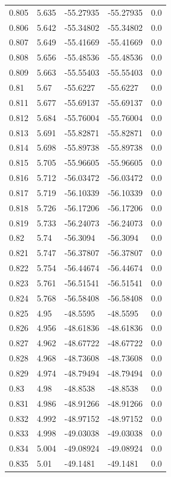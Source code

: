 \begin{tabular}{lllll}
0.805 & 5.635 & -55.27935 & -55.27935 & 0.0 \\
0.806 & 5.642 & -55.34802 & -55.34802 & 0.0 \\
0.807 & 5.649 & -55.41669 & -55.41669 & 0.0 \\
0.808 & 5.656 & -55.48536 & -55.48536 & 0.0 \\
0.809 & 5.663 & -55.55403 & -55.55403 & 0.0 \\
0.81 & 5.67 & -55.6227 & -55.6227 & 0.0 \\
0.811 & 5.677 & -55.69137 & -55.69137 & 0.0 \\
0.812 & 5.684 & -55.76004 & -55.76004 & 0.0 \\
0.813 & 5.691 & -55.82871 & -55.82871 & 0.0 \\
0.814 & 5.698 & -55.89738 & -55.89738 & 0.0 \\
0.815 & 5.705 & -55.96605 & -55.96605 & 0.0 \\
0.816 & 5.712 & -56.03472 & -56.03472 & 0.0 \\
0.817 & 5.719 & -56.10339 & -56.10339 & 0.0 \\
0.818 & 5.726 & -56.17206 & -56.17206 & 0.0 \\
0.819 & 5.733 & -56.24073 & -56.24073 & 0.0 \\
0.82 & 5.74 & -56.3094 & -56.3094 & 0.0 \\
0.821 & 5.747 & -56.37807 & -56.37807 & 0.0 \\
0.822 & 5.754 & -56.44674 & -56.44674 & 0.0 \\
0.823 & 5.761 & -56.51541 & -56.51541 & 0.0 \\
0.824 & 5.768 & -56.58408 & -56.58408 & 0.0 \\
0.825 & 4.95 & -48.5595 & -48.5595 & 0.0 \\
0.826 & 4.956 & -48.61836 & -48.61836 & 0.0 \\
0.827 & 4.962 & -48.67722 & -48.67722 & 0.0 \\
0.828 & 4.968 & -48.73608 & -48.73608 & 0.0 \\
0.829 & 4.974 & -48.79494 & -48.79494 & 0.0 \\
0.83 & 4.98 & -48.8538 & -48.8538 & 0.0 \\
0.831 & 4.986 & -48.91266 & -48.91266 & 0.0 \\
0.832 & 4.992 & -48.97152 & -48.97152 & 0.0 \\
0.833 & 4.998 & -49.03038 & -49.03038 & 0.0 \\
0.834 & 5.004 & -49.08924 & -49.08924 & 0.0 \\
0.835 & 5.01 & -49.1481 & -49.1481 & 0.0 \\

\end{tabular}
